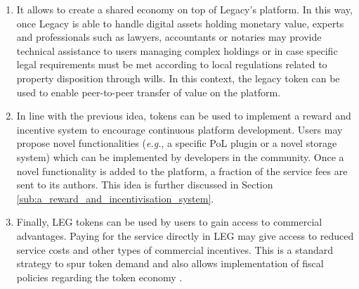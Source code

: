 \begin{enumerate}
	\item It allows to create a shared economy on top of Legacy's platform. In this way, once Legacy is able to handle digital assets holding monetary value, experts and professionals such as lawyers, accountants or notaries may provide technical assistance to users managing complex holdings or in case specific legal requirements must be met according to local regulations related to property disposition through wills. In this context, the legacy token can be used to enable peer-to-peer transfer of value on the platform.
	\item In line with the previous idea, tokens can be used to implement a reward and incentive system to encourage continuous platform development. Users may propose novel functionalities (\textit{e.g.}, a specific PoL plugin or a novel storage system) which can be implemented by developers in the community. Once a novel functionality is added to the platform, a fraction of the service fees are sent to its authors.
	This idea is further discussed in Section \ref{sub:a_reward_and_incentivisation_system}.
	\item Finally, LEG tokens can be used by users to gain access to commercial advantages. Paying for the service directly in LEG may give access to reduced service costs and other types of commercial incentives. This is a standard strategy to spur token demand and also allows implementation of fiscal policies regarding the token economy \cite{Sehra2017}.

\end{enumerate}



